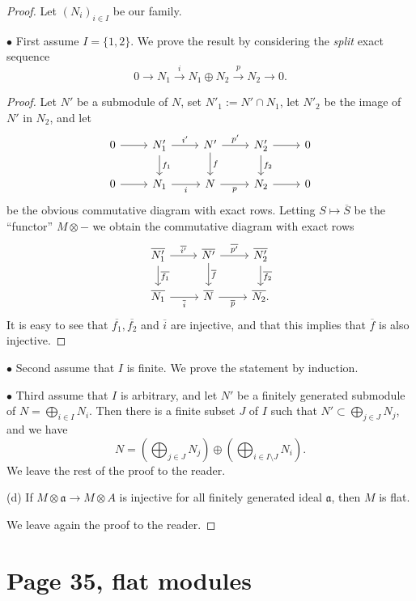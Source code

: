 \documentclass[parskip=half]{scrartcl}%
\newcommand{\mf}{\mathfrak}
\newcommand{\aaa}{\mf a}
\newcommand{\bu}{\bullet}
\begin{document}
\begin{proof} 
Let $(N_i)_{i\in I}$ be our family. 

$\bu$ First assume $I=\{1,2\}$. We prove the result by considering the \emph{split} exact sequence 
$$
0\to N_1\xrightarrow i N_1\oplus N_2\xrightarrow pN_2\to0.
$$ 
\begin{proof}
Let $N'$ be a submodule of $N$, set $N'_1:=N'\cap N_1$, let $N'_2$ be the image of $N'$ in $N_2$, and let 
$$
\begin{tikzcd}
0\ar[r]&N'_1\ar[d,"f_1"]\ar[r,"i'"]&N'\ar[d,"f"]\ar[r,"p'"]&N'_2\ar[d,"f_2"]\ar[r]&0\\ 
0\ar[r]&N_1\ar[r,"i"']&N\ar[r,"p"']&N_2\ar[r]&0
\end{tikzcd}
$$  
be the obvious commutative diagram with exact rows. Letting $S\mapsto\overline S$ be the ``functor'' $M\otimes-$ we obtain the commutative diagram with exact rows
$$
\begin{tikzcd}
\overline{N'_1}\ar[d,"\overline{f_1}"]\ar[r,"\overline{i'}"]&\overline{N'}\ar[d,"\overline f"]\ar[r,"\overline{p'}"]& \overline{N'_2}\ar[d,"\overline{f_2}"]\\ 
\overline{N_1}\ar[r,"\overline i"']&\overline N\ar[r,"\overline p"']& \overline{N_2}.
\end{tikzcd}
$$ 
It is easy to see that $\overline{f_1},\overline{f_2}$ and $\overline i$ are injective, and that this implies that $\overline f$ is also injective.
\end{proof}

$\bu$ Second assume that $I$ is finite. We prove the statement by induction.

$\bu$ Third assume that $I$ is arbitrary, and let $N'$ be a finitely generated submodule of $N=\bigoplus_{i\in I}N_i$. Then there is a finite subset $J$ of $I$ such that $N'\subset\bigoplus_{j\in J}N_j$, and we have 
$$
N=\left(\bigoplus_{j\in J}N_j\right)\oplus\left(\bigoplus_{i\in I\setminus J}N_i\right). 
$$ 
We leave the rest of the proof to the reader.

(d) If $M\otimes\aaa\to M\otimes A$ is injective for all finitely generated ideal $\aaa$, then $M$ is flat.

We leave again the proof to the reader. 
\end{proof}

\section{Page 35, flat modules}%
\end{document}
